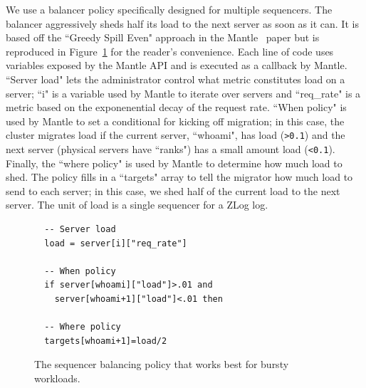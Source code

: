\documentclass[preprint]{sigplanconf-eurosys}
\begin{document}
We use a balancer policy specifically designed for multiple sequencers. The
balancer aggressively sheds half its load to the next server as soon as it can.
It is based off the ``Greedy Spill Even" approach in the
Mantle~\cite{sevilla:sc15-mantle} paper but is reproduced in
Figure~\ref{listing:greedy-spill} for the reader's convenience. Each line of
code uses variables exposed by the Mantle API and is executed as a callback by
Mantle.  ``Server load" lets the administrator control what metric constitutes
load on a server; ``i" is a variable used by Mantle to iterate over servers and
``req\_rate" is a metric based on the exponenential decay of the request rate.
``When policy" is used by Mantle to set a conditional for kicking off migration;
in this case, the cluster migrates load if the current server, ``whoami", has
load (\texttt{>0.1}) and the next server (physical servers have ``ranks") has a
small amount load (\texttt{<0.1}). Finally, the ``where policy" is used by
Mantle to determine how much load to shed. The policy fills in a ``targets"
array to tell the migrator how much load to send to each server; in this case,
we shed half of the current load to the next server. The unit of load is a
single sequencer for a ZLog log.

\begin{figure}[]
\begin{lstlisting}
  -- Server load
  load = server[i]["req_rate"]
  
  -- When policy
  if server[whoami]["load"]>.01 and 
    server[whoami+1]["load"]<.01 then
    
  -- Where policy
  targets[whoami+1]=load/2
\end{lstlisting}
\caption{The sequencer balancing policy that works best for bursty workloads. 
\label{listing:greedy-spill}}
\end{figure}
\end{document}
